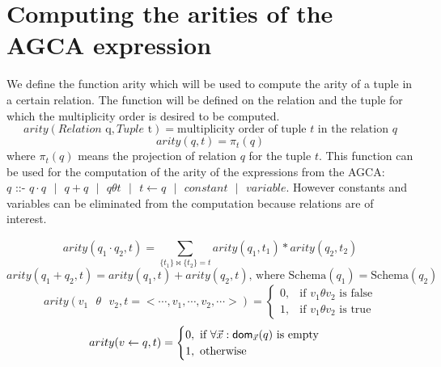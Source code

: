\documentclass[12pt]{article}
\begin{document}
\section{Computing the arities of the AGCA expression}

We define the function arity which will be used to compute the arity of a tuple in a certain relation. The function will be defined on the relation and the tuple for which the multiplicity order is desired to be computed. $$arity(Relation\text{ q},Tuple\text{ t})=\text{multiplicity order of tuple }t\text{ in the relation } q$$ $$arity(q,t)=\pi_{t}(q)$$ where $\pi_{t}(q)$ means the projection of relation $q$ for the tuple $t$. This function can be used for the computation of the arity of the expressions from the AGCA: $q\text{ ::- }q\cdot q\text{ }|\text{ }q+q\text{ }|\text{ }q \theta t\text{ }|\text{ }t\gets q\text{ }|\text{ }constant\text{ }|\text{ }variable$. However constants and variables can be eliminated from the computation because relations are of interest.

$$arity(q_{1}\cdot q_{2},t)=\sum\limits_{\{t_{1}\}\Join \{t_{2}\}={t}}^{}arity(q_{1},t_{1})*arity(q_{2},t_{2})$$
$$arity(q_{1} + q_{2},t)=arity(q_{1},t)+arity(q_{2},t)\text{, where Schema}(q_{1})=\text{Schema}(q_{2}) $$
$$arity(v_1\text{ } \theta \text{ } v_2,t=<\cdots,v_1,\cdots,v_2,\cdots>)=\begin{cases}0,& \mbox{if } v_1\theta v_2 \mbox{ is false}\\ 1,& \mbox{if } v_1\theta v_2 \mbox{ is true} \end{cases}$$
$$arity(v\gets q,t)=\begin{cases}0, \mbox{ if $\forall \vec{x}: \text{\textsf{dom}}_{\vec{x}}(q)$ is empty}\\ 1, \mbox{ otherwise} \end{cases}$$
\end{document}
